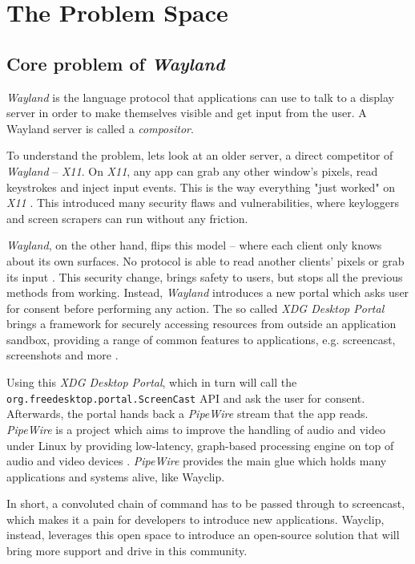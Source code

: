 \chapter{The Problem Space}

\section{Core problem of \emph{Wayland}}

\emph{Wayland} is the language protocol that applications can use to talk to a display server in order to make themselves visible and get input from the user. A Wayland server is called a \textit{compositor}. \cite{wayland}

To understand the problem, lets look at an older server, a direct competitor of \emph{Wayland} -- \emph{X11}.
On \emph{X11}, any app can grab any other window's pixels, read keystrokes and inject input events.
This is the way everything "just worked" on \emph{X11} \cite{botmonster_wayland_screenshare}.
This introduced many security flaws and vulnerabilities, where keyloggers and screen scrapers can run without any friction.

\emph{Wayland}, on the other hand, flips this model -- where each client only knows about its own surfaces. No protocol is able to read
another clients' pixels or grab its input \cite{botmonster_wayland_screenshare}. This security change, brings safety to users, but stops all the previous methods from working.
Instead, \emph{Wayland} introduces a new portal which asks user for consent before performing any action. The so called \emph{XDG Desktop Portal} brings a framework for securely accessing resources from outside an application sandbox,
providing a range of common features to applications, e.g. screencast, screenshots and more \cite{archwiki_xdg_portal}.

Using this \emph{XDG Desktop Portal}, which in turn will call the \lstinline|org.freedesktop.portal.ScreenCast| API and ask the user for consent. Afterwards, the portal hands back a \emph{PipeWire} stream that the app reads.
\emph{PipeWire} is a project which aims to improve the handling of audio and video under Linux by providing low-latency, graph-based processing engine on top of audio and video devices \cite{pipewire}.
\emph{PipeWire} provides the main glue which holds many applications and systems alive, like Wayclip.

In short, a convoluted chain of command has to be passed through to screencast, which makes it a pain for developers to introduce new applications. Wayclip, instead, leverages this open space to introduce an open-source solution that will bring more support and drive in this community.


